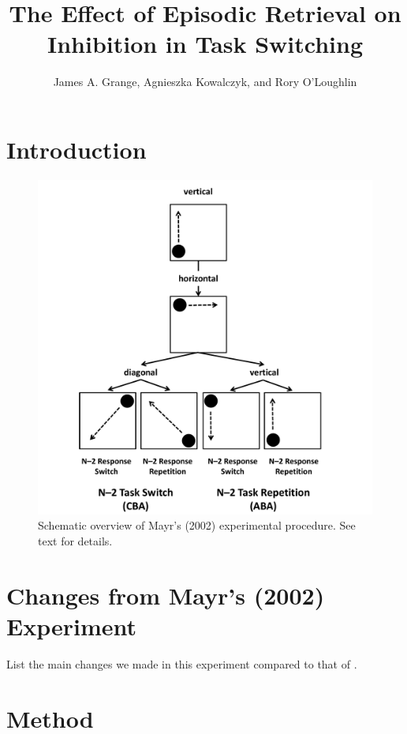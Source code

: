 \documentclass[a4paper, doc, natbib]{apa6}
\title{The Effect of Episodic Retrieval on Inhibition in Task Switching}
\author{James A. Grange, Agnieszka Kowalczyk, and Rory O'Loughlin}
\affiliation{School of Psychology, Keele University, UK}
\begin{document}
\maketitle

\section{Introduction}



\begin{figure}
\begin{center}
\includegraphics[width = \textwidth]{Images/mayrExperiment.pdf}
\caption{Schematic overview of Mayr's (2002) experimental procedure. See text for details.}
\label{fig:mayrExperiment}
\end{center}
\end{figure}


\section{Changes from Mayr's (2002) Experiment}
List the main changes we made in this experiment compared to that of \cite{Mayr2002}.

\section{Method}
\end{document}
